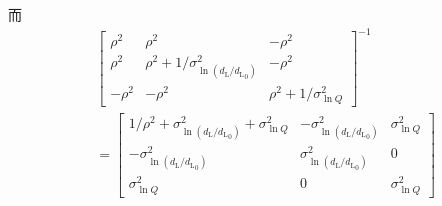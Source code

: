 而
\begin{align}
    &\begin{bmatrix}
        \rho^2&\rho^2&-\rho^2\\
        \rho^2&\rho^2+1/\sigma_{\ln (d_\text{L}/{d_\text{L}}_0)}^2&-\rho^2\\
        -\rho^2&-\rho^2&\rho^2+1/\sigma_{\ln Q}^2
    \end{bmatrix}^{-1}\\
    &=\begin{bmatrix}
        1/\rho^2+\sigma_{\ln (d_\text{L}/{d_\text{L}}_0)}^2+\sigma_{\ln Q}^2&-\sigma_{\ln (d_\text{L}/{d_\text{L}}_0)}^2&\sigma_{\ln Q}^2\\
        -\sigma_{\ln (d_\text{L}/{d_\text{L}}_0)}^2&\sigma_{\ln (d_\text{L}/{d_\text{L}}_0)}^2&0\\
        \sigma_{\ln Q}^2&0&\sigma_{\ln Q}^2
    \end{bmatrix}
\end{align}
